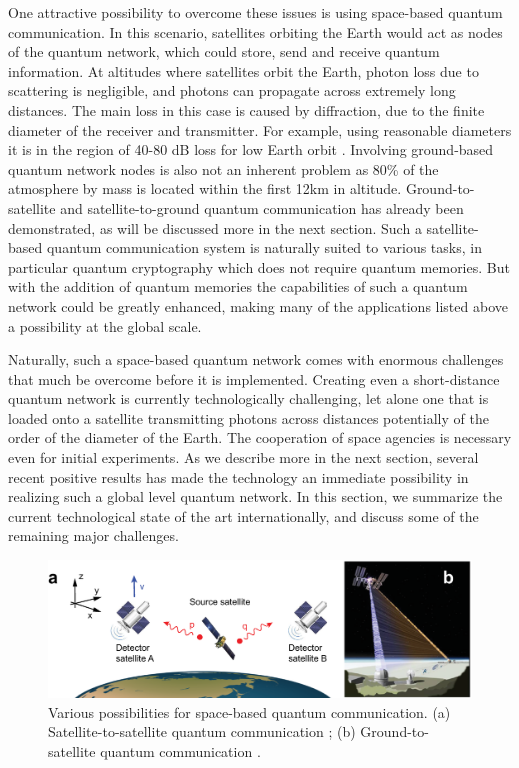 \documentclass[aps,rmp,reprint,amsmath,amssymb,graphicx,longbibliography]{revtex4-1}
\begin{document}
One attractive possibility to overcome these issues is using space-based quantum communication. In this scenario, satellites orbiting the Earth would act as nodes of the quantum network, which could store, send and receive quantum information. At altitudes where satellites orbit the Earth, photon loss due to scattering is negligible, and photons can propagate across extremely long distances. The main loss in this case is caused by diffraction, due to the finite diameter of the receiver and transmitter. For example, using reasonable diameters it is in the region of 40-80 dB loss for low Earth orbit \cite{aspelmeyer2003long,liao2016ground}. Involving ground-based quantum network nodes is also not an inherent problem as 80\% of the atmosphere by mass is located within the first 12km in altitude. Ground-to-satellite and satellite-to-ground quantum communication has already been demonstrated, as will be discussed more in the next section. Such a satellite-based quantum communication system is naturally suited to various tasks, in particular quantum cryptography which does not require quantum memories. But with the addition of quantum memories the capabilities of such a quantum network could be greatly enhanced, making many of the applications listed above a possibility at the global scale. 


Naturally, such a space-based quantum network comes with enormous challenges that much be overcome before it is implemented. Creating even a short-distance quantum network is currently technologically challenging, let alone one that is loaded onto a satellite transmitting photons across distances potentially of the order of the diameter of the Earth. The cooperation of space agencies is necessary even for initial experiments. As we describe more in the next section, several recent positive results has made the technology an immediate possibility in realizing such a global level quantum network. In this section, we summarize the current technological state of the art internationally, and discuss some of the remaining major challenges.  




\begin{figure}
\includegraphics[width=\columnwidth]{figspace1}
\caption{Various possibilities for space-based quantum communication. (a) Satellite-to-satellite quantum communication \cite{byrnes2017lorentz}; (b) Ground-to-satellite quantum communication \cite{armengol08}. }
\label{figspace1}
\end{figure}
\end{document}
